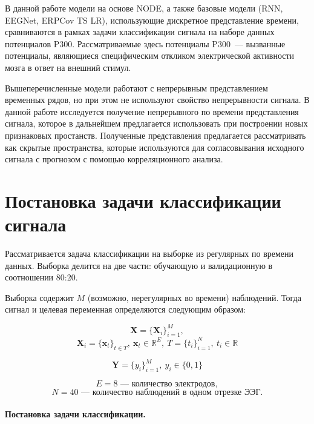 \documentclass{article}
\newcommand{\x}{\mathbf{x}}
\newcommand{\Y}{\mathbf{Y}}
\newcommand{\X}{\mathbf{X}}
\newcommand{\R}{\mathbb{R}}
\begin{document}

В данной работе модели на основе NODE, а также базовые модели (RNN, EEGNet\cite{Lawhern2018EEGNetAC}, ERPCov TS LR\cite{6046114}), использующие дискретное представление времени, сравниваются в рамках задачи классификации сигнала на наборе данных потенциалов P300. Рассматриваемые здесь потенциалы P300~--- вызванные потенциалы, являющиеся специфическим откликом электрической активности мозга в ответ на внешний стимул.

Вышеперечисленные модели работают с непрерывным представлением временных рядов, но при этом не используют свойство непрерывности сигнала. В данной работе исследуется получение непрерывного по времени представления сигнала, которое в дальнейшем предлагается использовать при построении новых признаковых простанств. Полученные представления предлагается рассматривать как скрытые пространства, которые используются для согласовывания исходного сигнала с прогнозом с помощью корреляционного анализа.

\section{Постановка задачи классификации сигнала}


    
    Рассматривается задача классификации на выборке из регулярных по времени данных. Выборка делится на две части: обучающую и валидационную в соотношении 80:20.
    
    Выборка содержит $M$ (возможно, нерегулярных во времени) наблюдений. Тогда сигнал и целевая переменная определяются следующим образом:
    

    $$\X = \{\X_i\}_{i=1}^{M},$$
    $$\X_i = \{\x_t\}_{t\in T}, \ \x_t \in \R^E, \ T = \{t_i\}_{i=1}^{N},\ t_i \in \R$$ 
    
    $$\Y = \{y_i\}_{i=1}^{M},\ y_i \in \{0, 1\}$$
    
    $$E = 8 \text{~--- количество электродов},$$
    $$N = 40 \text{~--- количество наблюдений в одном отрезке ЭЭГ}.$$

    \paragraph{Постановка задачи классификации.}
    
\end{document}

